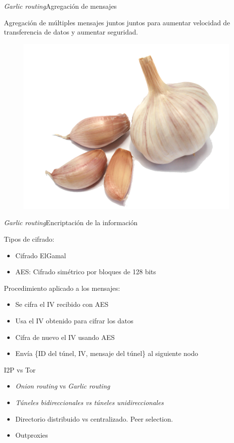 \documentclass[spanish]{beamer}
\begin{document}
 
 \begin{frame}{\textit{Garlic routing}}{Agregación de mensajes}
 
 
 Agregación de múltiples mensajes juntos juntos para aumentar velocidad de transferencia de datos y aumentar seguridad.
 
 \begin{figure}
\centering
\includegraphics[width=.35\textwidth]{img/garlic}
\end{figure}

 	
 \end{frame}
 
 \begin{frame}{\textit{Garlic routing}}{Encriptación de la información}
 
 Tipos de cifrado:
 \begin{itemize}
 	\item Cifrado ElGamal
 	\item AES: Cifrado simétrico por bloques de 128 bits
 \end{itemize}
 \vspace{1em}
 
 Procedimiento aplicado a los mensajes:
 	\begin{itemize}
 		\item Se cifra el IV recibido con AES
 		\item Usa el IV obtenido para cifrar los datos
 		\item Cifra de nuevo el IV usando AES
 		\item Envía \{ID del túnel, IV, mensaje del túnel\} al siguiente nodo
 	\end{itemize}

 
 \end{frame}
 
 
 
 \begin{frame}{I2P vs Tor}
 
 \begin{itemize}
	\item \textit{Onion routing} vs \textit{Garlic routing}
	\item \textit{Túneles bidireccionales vs túneles unidireccionales}
	\item Directorio distribuido vs centralizado. Peer selection.
	\item Outproxies
\end{itemize}
   
\end{frame}
 
\end{document}
